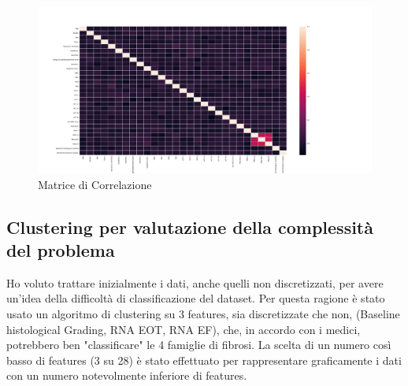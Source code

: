 \begin{figure}[H]
    \centering
    \includegraphics[width=1\columnwidth]{figures/matrx_corr.png}
    \caption{Matrice di Correlazione}
    \label{fig:matr_corr}
\end{figure}

\subsection{Clustering per valutazione della complessità del problema}

Ho voluto trattare inizialmente i dati, anche quelli non discretizzati, per avere un'idea della difficoltà di classificazione del dataset. Per questa ragione è stato usato un algoritmo di clustering su 3 features, sia discretizzate che non, (Baseline histological Grading, RNA EOT, RNA EF), che, in accordo con i medici, potrebbero ben "classificare" le 4 famiglie di fibrosi. La scelta di un numero così basso di features (3 su 28) è stato effettuato per rappresentare graficamente i dati con un numero notevolmente inferiore di features. 

